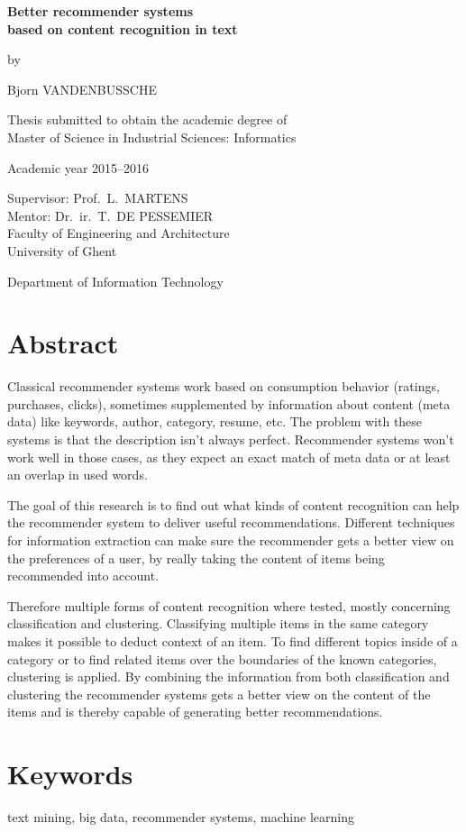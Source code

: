 {
\setlength{\baselineskip}{14pt}
\setlength{\parindent}{0pt}
\setlength{\parskip}{8pt}

\begin{center}

\noindent \textbf{\huge
Better recommender systems\\[8pt]based on content recognition in text
}

by 

Bjorn VANDENBUSSCHE

Thesis submitted to obtain the academic degree of\\
Master of Science in Industrial Sciences: Informatics

Academic year 2015--2016

Supervisor: Prof.~L.~MARTENS\\
Mentor: Dr.~ir.~T.~DE PESSEMIER\\

Faculty of Engineering and Architecture\\
University of Ghent

Department of Information Technology

\end{center}

\section*{Abstract}

Classical recommender systems work based on consumption behavior (ratings, purchases, clicks), sometimes supplemented by information about content (meta data) like keywords, author, category, resume, etc. The problem with these systems is that the description isn't always perfect. Recommender systems won't work well in those cases, as they expect an exact match of meta data or at least an overlap in used words.

The goal of this research is to find out what kinds of content recognition can help the recommender system to deliver useful recommendations. Different techniques for information extraction can make sure the recommender gets a better view on the preferences of a user, by really taking the content of items being recommended into account.

Therefore multiple forms of content recognition where tested, mostly concerning classification and clustering. Classifying multiple items in the same category makes it possible to deduct context of an item. To find different topics inside of a category or to find related items over the boundaries of the known categories, clustering is applied. By combining the information from both classification and clustering the recommender systems gets a better view on the content of the items and is thereby capable of generating better recommendations.

\section*{Keywords}

text mining, big data, recommender systems, machine learning

}

\newpage %
